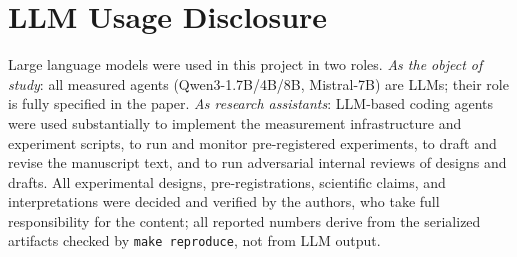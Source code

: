 \documentclass{article}
\theoremstyle{remark}
\begin{document}
\section{LLM Usage Disclosure}
Large language models were used in this project in two roles.
\emph{As the object of study}: all measured agents (Qwen3-1.7B/4B/8B,
Mistral-7B) are LLMs; their role is fully specified in the paper.
\emph{As research assistants}: LLM-based coding agents were used
substantially to implement the measurement infrastructure and experiment
scripts, to run and monitor pre-registered experiments, to draft and
revise the manuscript text, and to run adversarial internal reviews of
designs and drafts. All experimental designs, pre-registrations,
scientific claims, and interpretations were decided and verified by the
authors, who take full responsibility for the content; all reported
numbers derive from the serialized artifacts checked by
\texttt{make reproduce}, not from LLM output.
\end{document}

